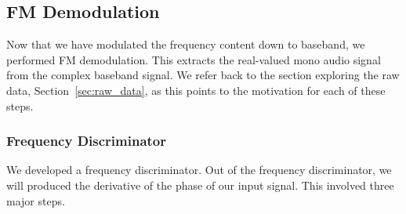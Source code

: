 \documentclass{article}
\begin{document}
\subsection{FM Demodulation}

Now that we have modulated the frequency content down to baseband, we performed FM demodulation. This extracts the real-valued mono audio signal from the complex baseband signal. We refer back to the section exploring the raw data, Section~\ref{sec:raw_data}, as this points to the motivation for each of these steps.

\subsubsection{Frequency Discriminator}

We developed a frequency discriminator. Out of the frequency discriminator, we will produced the derivative of the phase of our input signal. This involved three major steps.
\end{document}
